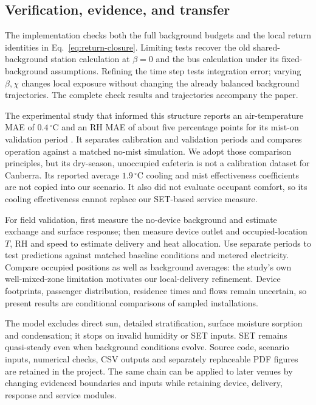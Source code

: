 \subsection{Verification, evidence, and transfer}

The implementation checks both the full background budgets and the local return identities in Eq.~\eqref{eq:return-closure}. Limiting tests recover the old shared-background station calculation at $\beta=0$ and the bus calculation under its fixed-background assumptions. Refining the time step tests integration error; varying $\beta,\chi$ changes local exposure without changing the already balanced background trajectories. The complete check results and trajectories accompany the paper.



The experimental study that informed this structure reports an air-temperature MAE of $0.4\,^{\circ}\mathrm C$ and an RH MAE of about five percentage points for its mist-on validation period \cite{cruz2026}. It separates calibration and validation periods and compares operation against a matched no-mist simulation. We adopt those comparison principles, but its dry-season, unoccupied cafeteria is not a calibration dataset for Canberra. Its reported average $1.9\,^{\circ}\mathrm C$ cooling and mist effectiveness coefficients are not copied into our scenario. It also did not evaluate occupant comfort, so its cooling effectiveness cannot replace our SET-based service measure.

For field validation, first measure the no-device background and estimate exchange and surface response; then measure device outlet and occupied-location $T$, RH and speed to estimate delivery and heat allocation. Use separate periods to test predictions against matched baseline conditions and metered electricity. Compare occupied positions as well as background averages: the study's own well-mixed-zone limitation motivates our local-delivery refinement. Device footprints, passenger distribution, residence times and flows remain uncertain, so present results are conditional comparisons of sampled installations.

The model excludes direct sun, detailed stratification, surface moisture sorption and condensation; it stops on invalid humidity or SET inputs. SET remains quasi-steady even when background conditions evolve. Source code, scenario inputs, numerical checks, CSV outputs and separately replaceable PDF figures are retained in the project. The same chain can be applied to later venues by changing evidenced boundaries and inputs while retaining device, delivery, response and service modules.
